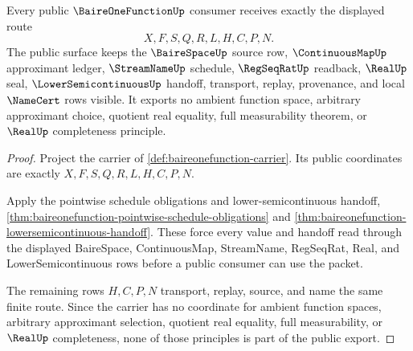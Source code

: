 \begin{theorem}
\label{thm:baireonefunction-public-export}
Every public $\BaireOneFunctionUp$ consumer receives exactly the displayed route
$$
X,F,S,Q,R,L,H,C,P,N .
$$
The public surface keeps the $\BaireSpaceUp$ source row, $\ContinuousMapUp$ approximant ledger, $\StreamNameUp$ schedule, $\RegSeqRatUp$ readback, $\RealUp$ seal, $\LowerSemicontinuousUp$ handoff, transport, replay, provenance, and local $\NameCert$ rows visible. It exports no ambient function space, arbitrary approximant choice, quotient real equality, full measurability theorem, or $\RealUp$ completeness principle.
\end{theorem}
\begin{proof}
Project the carrier of \autoref{def:baireonefunction-carrier}. Its public coordinates are exactly $X,F,S,Q,R,L,H,C,P,N$.

Apply the pointwise schedule obligations and lower-semicontinuous handoff, \autoref{thm:baireonefunction-pointwise-schedule-obligations} and \autoref{thm:baireonefunction-lowersemicontinuous-handoff}. These force every value and handoff read through the displayed BaireSpace, ContinuousMap, StreamName, RegSeqRat, Real, and LowerSemicontinuous rows before a public consumer can use the packet.

The remaining rows $H,C,P,N$ transport, replay, source, and name the same finite route. Since the carrier has no coordinate for ambient function spaces, arbitrary approximant selection, quotient real equality, full measurability, or $\RealUp$ completeness, none of those principles is part of the public export.
\end{proof}

